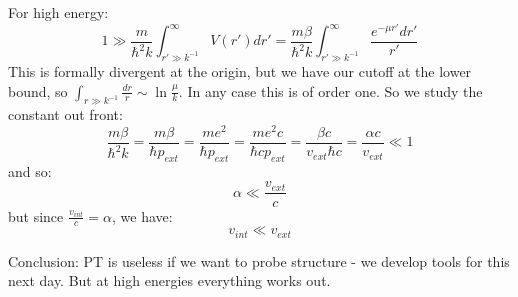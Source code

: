 For high energy:
\begin{equation}
    1 \gg \frac{m}{\hbar^2 k}\int_{r' \gg k^{-1}}^\infty V(r')dr' = \frac{m\beta}{\hbar^2 k}\int_{r' \gg k^{-1}}^\infty \frac{e^{-\mu r'}dr'}{r'}
\end{equation}
This is formally divergent at the origin, but we have our cutoff at the lower bound, so $\int_{r \gg k^{-1}} \frac{dr}{r} \sim \ln \frac{\mu}{k}$. In any case this is of order one. So we study the constant out front:
\begin{equation}
    \frac{m\beta}{\hbar^2 k} = \frac{m\beta}{\hbar p_{ext}} = \frac{me^2}{\hbar p_{ext}} = \frac{me^2c}{\hbar c p_{ext}} = \frac{\beta c}{v_{ext} \hbar c} = \frac{\alpha c}{v_{ext}} \ll 1
\end{equation}
and so:
\begin{equation}
    \alpha \ll \frac{v_{ext}}{c}
\end{equation}
but since $\frac{v_{int}}{c} = \alpha$, we have:
\begin{equation}
    v_{int} \ll v_{ext}
\end{equation}

Conclusion: PT is useless if we want to probe structure - we develop tools for this next day. But at high energies everything works out.